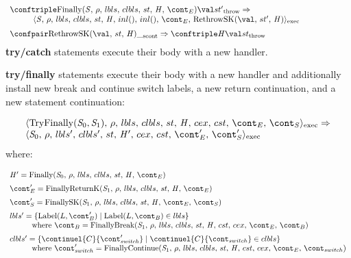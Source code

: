 \documentclass{article}
\begin{document}
\[
  \begin{array}{lcl}
	\throwconf{\FinallyK{\stmt}}{\val}{\strace'}
	\Rightarrow \\
	\hspace{10mm}\execconf{\stmt}{\env}{\lbls}{\clbls}{\handler}{inl()}{inl()}{\econt}{\RethrowSK{\val}{\strace'}{\handler}}\hspace{20mm}\\[2mm]

	\scontconf{\RethrowSK{\val}{\strace}{\handler}}{\_}
	\Rightarrow \throwconf{\handler}{\val}{\strace}

  \end{array}
\]
\noindent
\textbf{try/catch} statements execute their body with a new handler.

\noindent
\textbf{try/finally} statements execute their body with a new handler and additionally install new break and continue switch labels, a new return continuation, and a new statement continuation:

\[
  \begin{array}{lcl}
	\execconf{\mathrm{TryFinally}(\stmti{0}, \stmti{1})}{\env}{\lbls}{\clbls}{\handler}{\cex}{\cstrace}{\econt}{\scont}
	\Rightarrow\\
	\execconf{\stmti{0}}{\env}{\lbls'}{\clbls'}{\handler'}{\cex}{\cstrace}{\econt'}{\scont'}
	  \end{array}
\]
where:

\[
  \begin{array}{lcl}
	\handler' = \FinallyK{\stmti{0}}\hspace{50mm}\\[2mm]

	\econt' = \FinallyReturnK{\stmti{1}}\\[2mm]

	\scont' = \FinallySK{\stmti{1}}\\[2mm]

	\lbls' = \lbrace \mathrm{Label}(L, \bcont') \mid \mathrm{Label}(L, \bcont) \in \lbls\rbrace \\
	\hspace{10mm}\textrm{where } \bcont = \FinallyBreak{\stmti{1}}{\bcont}\\[2mm]
	\clbls' =  \lbrace \continuel{C}{\switchcont'} \mid  \continuel{C}{\switchcont} \in \clbls\rbrace\\
	\hspace{10mm}\textrm{where } \switchcont' = \FinallyContinue{\stmti{1}}{\switchcont}

  \end{array}
\]
\end{document}
